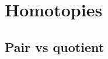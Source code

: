 \documentclass[english,11pt]{article}
\theoremstyle{plain}
\newtheorem{lemma}{Lemma}[section]
\theoremstyle{remark}
\theoremstyle{definition}
\begin{document}
%
%

\section{Homotopies}\label{sec_hom}

\subsection{Pair vs quotient}
\end{document}
